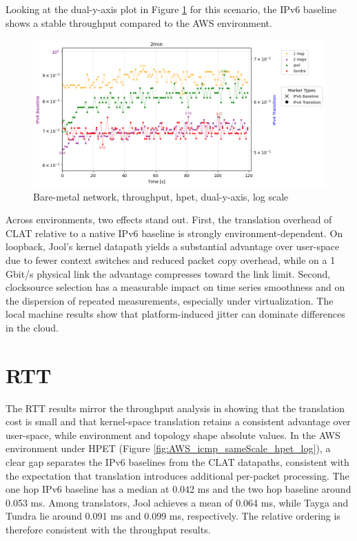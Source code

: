 Looking at the dual-y-axis plot in Figure \ref{fig:Double_tcp_dualAxis_hpet_log} for this scenario, the IPv6 baseline shows a stable throughput compared to the AWS environment.
\begin{figure}[H]
    \centering
    \includegraphics[width=1\textwidth]{resources/finalPlots/Jitterplots/LocalDouble_tcp_dualAxis_hpet_2min_log.png}
    \caption{Bare-metal network, throughput, hpet, dual-y-axis, log scale}
    \label{fig:Double_tcp_dualAxis_hpet_log}
\end{figure}

Across environments, two effects stand out. First, the translation overhead of CLAT relative to a native IPv6 baseline is strongly environment-dependent. On loopback, Jool’s kernel datapath yields a substantial advantage over user-space due to fewer context switches and reduced packet copy overhead, while on a 1 Gbit/s physical link the advantage compresses toward the link limit. Second, clocksource selection has a measurable impact on time series smoothness and on the dispersion of repeated measurements, especially under virtualization. The local machine results show that platform-induced jitter can dominate differences in the cloud.

\section{RTT}
The RTT results mirror the throughput analysis in showing that the translation cost is small and that kernel-space translation retains a consistent advantage over user-space, while environment and topology shape absolute values. In the AWS environment under HPET (Figure \ref{fig:AWS_icmp_sameScale_hpet_log}), a clear gap separates the IPv6 baselines from the CLAT datapaths, consistent with the expectation that translation introduces additional per-packet processing. The one hop IPv6 baseline has a median at 0.042 ms and the two hop baseline around 0.053 ms. Among translators, Jool achieves a mean of 0.064 ms, while Tayga and Tundra lie around 0.091 ms and 0.099 ms, respectively. The relative ordering is therefore consistent with the throughput results.


